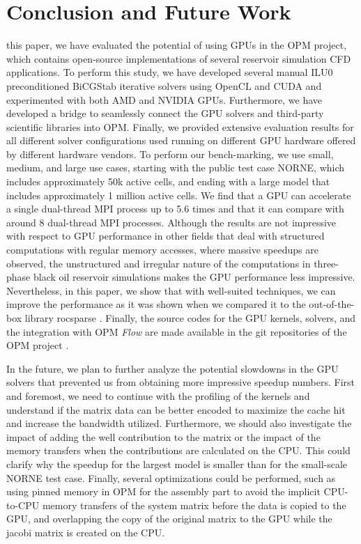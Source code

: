 \section{Conclusion and Future Work}
\label{sec:conclusion}

 this paper, we have evaluated the potential of using GPUs in the OPM project, which contains open-source implementations of several reservoir simulation CFD applications. To perform this study, we have developed several manual ILU0 preconditioned BiCGStab iterative solvers using OpenCL and CUDA and experimented with both AMD and NVIDIA GPUs. Furthermore, we have developed a bridge to seamlessly connect the GPU solvers and third-party scientific libraries into OPM. Finally, we provided extensive evaluation results for all different solver configurations used running on different GPU hardware offered by different hardware vendors. To perform our bench-marking, we use small, medium, and large use cases, starting with the public test case NORNE, which includes approximately 50k active cells, and ending with a large model that includes approximately 1 million active cells. We find that a GPU can accelerate a single dual-thread MPI process up to 5.6 times and that it can compare with around 8 dual-thread MPI processes. 
Although the results are not impressive with respect to GPU performance in other fields that deal with structured computations with regular memory accesses, where massive speedups are observed, the unstructured and irregular nature of the computations in three-phase black oil reservoir simulations makes the GPU performance less impressive. Nevertheless, in this paper, we show that with well-suited techniques, we can improve the performance as it was shown when we compared it to the out-of-the-box library rocsparse \cite{rocsparse}. 
Finally, the source codes for the GPU kernels, solvers, and the integration with OPM \textit{Flow} are made available in the git repositories of the OPM project \cite{opmrepo}. 

In the future, we plan to further analyze the potential slowdowns in the GPU solvers that prevented us from obtaining more impressive speedup numbers. First and foremost, we need to continue with the profiling of the kernels and understand if the matrix data can be better encoded to maximize the cache hit and increase the bandwidth utilized. Furthermore, we should also investigate the impact of adding the well contribution to the matrix or the impact of the memory transfers when the contributions are calculated on the CPU. This could clarify why the speedup for the largest model is smaller than for the small-scale NORNE test case. Finally, several optimizations could be performed, such as using pinned memory in OPM for the assembly part to avoid the implicit CPU-to-CPU memory transfers of the system matrix before the data is copied to the GPU, and overlapping the copy of the original matrix to the GPU while the jacobi matrix is created on the CPU. 
